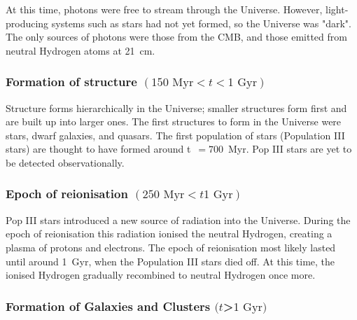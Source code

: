 \documentclass[]{book}
\begin{document}
At this time, photons were free to stream through the Universe. However,
light-producing systems such as stars had not yet formed, so the
Universe was "dark". The only sources of photons were those from the
CMB, and those emitted from neutral Hydrogen atoms at 21~cm.

\subsubsection*{\texorpdfstring{Formation of structure
\((150\text{ Myr} < t < 1\text{ Gyr})\)}{Formation of structure (150\textbackslash{}text\{ Myr\} \textless{} t \textless{} 1\textbackslash{}text\{ Gyr\})}}\label{formation-of-structure-150text-myr-t-1text-gyr}

Structure forms hierarchically in the Universe; smaller structures form
first and are built up into larger ones. The first structures to form in
the Universe were stars, dwarf galaxies, and quasars. The first
population of stars (Population III stars) are thought to have formed
around t~\(=700\)~Myr. Pop III stars are yet to be detected
observationally.

\subsubsection*{\texorpdfstring{Epoch of reionisation
\((250 \text{ Myr} < t 1\text{ Gyr})\)}{Epoch of reionisation (250 \textbackslash{}text\{ Myr\} \textless{} t 1\textbackslash{}text\{ Gyr\})}}\label{epoch-of-reionisation-250-text-myr-t-1text-gyr}

Pop III stars introduced a new source of radiation into the Universe.
During the epoch of reionisation this radiation ionised the neutral
Hydrogen, creating a plasma of protons and electrons. The epoch of
reionisation most likely lasted until around 1~Gyr, when the Population
III stars died off. At this time, the ionised Hydrogen gradually
recombined to neutral Hydrogen once more.

\subsubsection*{\texorpdfstring{Formation of Galaxies and Clusters
\((t\)\textgreater{}\(1 \text{ Gyr})\)}{Formation of Galaxies and Clusters (t\textgreater{}1 \textbackslash{}text\{ Gyr\})}}\label{formation-of-galaxies-and-clusters-t1-text-gyr}
\end{document}
